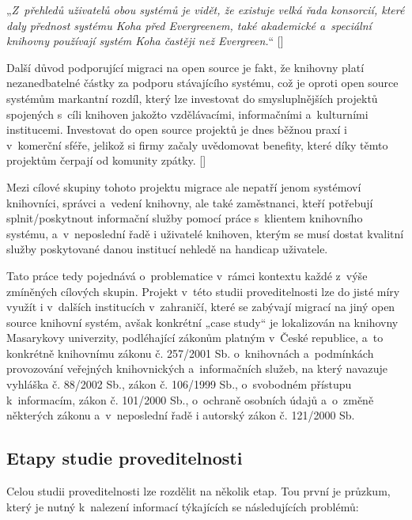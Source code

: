\documentclass[
	11pt, oneside, printed, final, palatino, monochrome
	microtype,
	table,   %
	lof,     %
	lot     %
]{fithesis3}
\makeatletter
\newcommand{\citepages}[2]{[\cite[#1]{#2}]}
\newcommand{\citesource}[1]{[\cite{#1}]}
\newcommand{\citace}[1]{„\textit{#1}“} %
\newcommand{\mezera}{\bigskip}
\makeatother
\begin{document}
{ \mezera
 \citace{Z~přehledů uživatelů obou systémů je vidět, že existuje velká řada konsorcií, které daly přednost systému Koha před Evergreenem, také akademické a~speciální knihovny používají systém Koha častěji než Evergreen.} \citesource{zabickova_2014}
 \mezera

Další důvod podporující migraci na open source je fakt, že knihovny platí nezanedbatelné částky za podporu stávajícího systému, což je oproti open source systémům markantní rozdíl, který lze investovat do smysluplnějších projektů spojených s~cíli knihoven jakožto vzdělávacími, informačními a~kulturními institucemi. Investovat do open source projektů je dnes běžnou praxí i v~komerční sféře, jelikož si firmy začaly uvědomovat benefity, které díky těmto projektům čerpají od komunity zpátky. \citepages{129-132}{Fogel2012}

Mezi cílové skupiny tohoto projektu migrace ale nepatří jenom systémoví knihovníci, správci a~vedení knihovny, ale také zaměstnanci, kteří potřebují splnit/poskytnout informační služby pomocí práce s~klientem knihovního systému, a~v~neposlední řadě i uživatelé knihoven, kterým se musí dostat kvalitní služby poskytované danou institucí nehledě na handicap uživatele.

Tato práce tedy pojednává o~problematice v~rámci kontextu každé z~výše zmíněných cílových skupin. Projekt v~této studii proveditelnosti lze do jisté míry využít i v~dalších institucích v~zahraničí, které se zabývají migrací na jiný open source knihovní systém, avšak konkrétní „case study“ je lokalizován na knihovny Masarykovy univerzity, podléhající zákonům platným v~České republice, a~to konkrétně knihovnímu zákonu č. 257/2001 Sb. o~knihovnách a~podmínkách provozování veřejných knihovnických a~informačních služeb, na který navazuje vyhláška č. 88/2002 Sb., zákon č. 106/1999 Sb., o~svobodném přístupu k~informacím, zákon č. 101/2000 Sb., o~ochraně osobních údajů a~o~změně některých zákonu a~v~neposlední řadě i autorský zákon č. 121/2000 Sb.

\subsection{Etapy studie proveditelnosti}

Celou studii proveditelnosti lze rozdělit na několik etap. Tou první je průzkum, který je nutný k~nalezení informací týkajících se následujících problémů:

}
\end{document}
